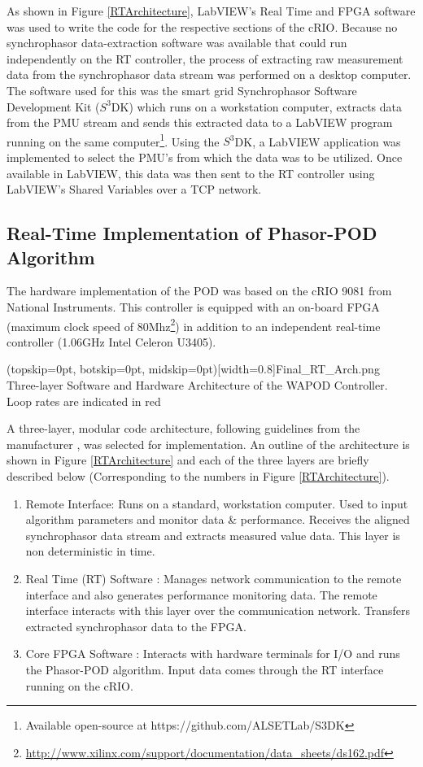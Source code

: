 \documentclass{ieeeaccess}
\begin{document}
As shown in Figure \ref{RTArchitecture}, LabVIEW's Real Time and FPGA software was used to write the code for the respective sections of the cRIO. Because no synchrophasor data-extraction software was available that could run independently on the RT controller, the process of extracting raw measurement data from the synchrophasor data stream was performed on a desktop computer. The software used for this was the smart grid Synchrophasor Software Development Kit ($S^{3}$DK) which runs on a workstation computer, extracts data from the PMU stream and sends this extracted data to a LabVIEW program running on the same computer\footnote{Available open-source at https://github.com/ALSETLab/S3DK}. Using the $S^{3}$DK, a LabVIEW application was implemented to select the PMU\rq{s} from which the data was to be utilized. Once available in LabVIEW, this data was then sent to the RT controller using LabVIEW\rq{s} Shared Variables \cite{LabViewManuals} over a TCP network.

\subsection{Real-Time Implementation of Phasor-POD Algorithm}
The hardware implementation of the POD was based on the cRIO 9081 \cite{cRIO9081} from National Instruments. This controller is equipped with an on-board FPGA (maximum clock speed of 80Mhz\footnote{\underline{http://www.xilinx.com/support/documentation/data\_sheets/ds162.pdf}}) in addition to an independent real-time controller (1.06GHz Intel Celeron U3405). 

\Figure[t!](topskip=0pt, botskip=0pt, midskip=0pt)[width=0.8\textwidth]{Final_RT_Arch.png}
{Three-layer Software and Hardware Architecture of the WAPOD Controller. Loop rates are indicated in red\label{RTArchitecture}}

A three-layer, modular code architecture\cite{Rebello_WAPOD_Software}, following guidelines from the manufacturer \cite{LabviewTemplate}, was selected for implementation. An outline of the architecture is shown in Figure \ref{RTArchitecture} and each of the three layers are briefly described below (Corresponding to the numbers in Figure \ref{RTArchitecture}). 

\begin{enumerate}
\item Remote Interface: Runs on a standard, workstation computer. Used to input algorithm parameters and monitor data \& performance. Receives the aligned synchrophasor data stream and extracts measured value data. This  layer is non deterministic in time.

\item Real Time (RT) Software : Manages network communication to the remote interface and also generates performance monitoring data. The remote interface interacts with this layer over the communication network. Transfers extracted synchrophasor data to the FPGA.

\item Core FPGA Software : Interacts with hardware terminals for I/O and runs the Phasor-POD algorithm. Input data comes through the RT interface running on the cRIO.

\end{enumerate}
\end{document}
